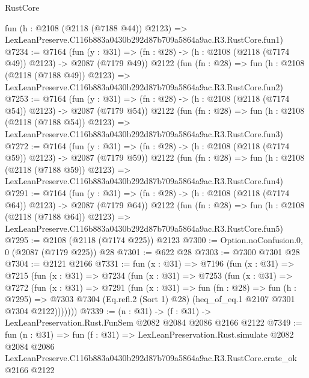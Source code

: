 \begin{lexlean}{RustCore}
\begin{coremodule}
    fun (h : @2108 (@2118 (@7188 @44)) @2123) =>
    LexLeanPreserve.C116b883a0430b292d87b709a5864a9ac.R3.RustCore.fun1)
@7234 := @7164
    (fun (y : @31) => (fn : @28) -> (h : @2108 (@2118 (@7174 @49)) @2123) -> @2087 (@7179 @49))
    @2122
    (fun (fn : @28) =>
    fun (h : @2108 (@2118 (@7188 @49)) @2123) =>
    LexLeanPreserve.C116b883a0430b292d87b709a5864a9ac.R3.RustCore.fun2)
@7253 := @7164
    (fun (y : @31) => (fn : @28) -> (h : @2108 (@2118 (@7174 @54)) @2123) -> @2087 (@7179 @54))
    @2122
    (fun (fn : @28) =>
    fun (h : @2108 (@2118 (@7188 @54)) @2123) =>
    LexLeanPreserve.C116b883a0430b292d87b709a5864a9ac.R3.RustCore.fun3)
@7272 := @7164
    (fun (y : @31) => (fn : @28) -> (h : @2108 (@2118 (@7174 @59)) @2123) -> @2087 (@7179 @59))
    @2122
    (fun (fn : @28) =>
    fun (h : @2108 (@2118 (@7188 @59)) @2123) =>
    LexLeanPreserve.C116b883a0430b292d87b709a5864a9ac.R3.RustCore.fun4)
@7291 := @7164
    (fun (y : @31) => (fn : @28) -> (h : @2108 (@2118 (@7174 @64)) @2123) -> @2087 (@7179 @64))
    @2122
    (fun (fn : @28) =>
    fun (h : @2108 (@2118 (@7188 @64)) @2123) =>
    LexLeanPreserve.C116b883a0430b292d87b709a5864a9ac.R3.RustCore.fun5)
@7295 := @2108 (@2118 (@7174 @225)) @2123
@7300 := Option.noConfusion.{0, 0} (@2087 (@7179 @225)) @28
@7301 := @622 @28
@7303 := @7300 @7301 @28
@7304 := @2121 @2166
@7331 := fun (x : @31) =>
  @7196
    (fun (x : @31) =>
    @7215
      (fun (x : @31) =>
      @7234
        (fun (x : @31) =>
        @7253
          (fun (x : @31) =>
          @7272
            (fun (x : @31) =>
            @7291
              (fun (x : @31) =>
              fun (fn : @28) =>
              fun (h : @7295) =>
              @7303 @7304 (Eq.refl.{2} (Sort 1) @28) (heq_of_eq.{1} @2107 @7301 @7304 @2122)))))))
@7339 := (n : @31) -> (f : @31) -> LexLeanPreservation.Rust.FunSem @2082 @2084 @2086 @2166 @2122
@7349 := fun (n : @31) =>
  fun (f : @31) =>
  LexLeanPreservation.Rust.simulate
    @2082
    @2084
    @2086
    LexLeanPreserve.C116b883a0430b292d87b709a5864a9ac.R3.RustCore.crate_ok
    @2166
    @2122
\end{coremodule}
\end{lexlean}
